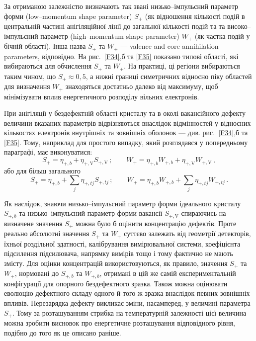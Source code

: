 За отриманою залежністю визначають так звані низько--імпульсний параметр форми
(low--momentum shape parameter) $S_+$ (як відношення кількості подій в центральній частині
анігіляційної лінії до загальної кількості подій та
та високо--імпульсний параметр (high--momentum shape parameter) $W_+$ (як частка подій у бічній області).
Інша назва $S_+$ та $W_+$ --- valence and core annihilation parameters, відповідно.
На рис.~\ref{F34},б та \ref{F35} показано типові області, які вибираються для обчислення $S_+$ та $W_+$.
На практиці, ці регіони вибираються таким чином, що $S_+\approx0,5$,
а нижні границі симетричних відносно піку областей для визначення $W_+$ знаходяться достатньо далеко від
максимуму, щоб мінімізувати вплив енергетичного розподілу вільних електронів.

При анігіляції у бездефектній області кристалу та в околі вакансійного дефекту
величини вказаних параметрів
відрізняються внаслідок відмінностей у відносних кількостях електронів внутрішніх
та зовнішніх оболонок --- див. рис.~\ref{F34},б та \ref{F35}.
Тому, наприклад для простого випадку, який розглядався у попередньому параграфі,
має виконуватися:
\begin{equation*}
S_+=\eta_{+,b}+\eta_{+,\mathrm{V}}S_{+,\mathrm{V}}\,;\qquad
W_+=\eta_{+,b}W_{+,b}+\eta_{+,\mathrm{V}}W_{+,\mathrm{V}}\,,
\end{equation*}
або для більш загального
\begin{equation*}
S_+=\eta_{+,b}+\sum_j\eta_{+,tj}S_{+,tj}\,;\qquad
W_+=\eta_{+,b}W_{+,b}+\sum_j\eta_{+,tj}W_{+,tj}\,.
\end{equation*}

Як наслідок, знаючи низько--імпульсний параметр форми ідеального кристалу $S_{+,b}$
та низько--імпульсний параметр форми вакансії $S_{+,\mathrm{V}}$
спираючись на визначене значення $S_+$ можна було б оцінити
концентрацію дефектів.
Проте реально абсолютні значення $S_+$ та $W_+$ суттєво залежать
від геометрії детекторів, їхньої роздільної здатності, калібрування
вимірювальної системи, коефіцієнта підсилення підсилювача,
напрямку вимірів тощо і тому фактично не мають змісту.
Для оцінки концентрацій використовуються, як правило,
значення $S_+$ та $W_+$, нормовані до $S_{+,b}$ та $W_{+,b}$,
отримані в цій же самій експериментальній  конфігурації
для опорного бездефектного зразка.
Також можна оцінювати еволюцію дефектного складу одного й того ж зразка внаслідок
певних зовнішніх впливів.
Перезарядка дефекту викликає зміни, насамперед, у величині параметра $S_+$.
Тому за розташуванням стрибка на температурній залежності
цієї величина можна зробити висновок
про енергетичне розташування відповідного рівня,
подібно до того як це описано раніше.



